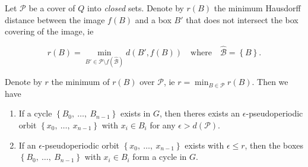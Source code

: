 \begin{proposition}
    \cite*{chain,dynbook}
    Let $\mathcal{P}$ be a cover of $Q$ into \emph{closed} sets. 
    Denote by $r(B)$ the minimum Hausdorff distance between the image $f(B)$ and a 
    box $B'$ that does not intersect the box covering of the image, ie 
    
    \begin{equation}
        r(B) = \min_{B' \in \mathcal{P} \setminus f(\hat{\mathcal{B}})} d(B', f(B)) 
        \quad \text{where} \quad \hat{\mathcal{B}} = \left\{ B \right\}.
    \end{equation}
    
    Denote by $r$ the minimum of $r(B)$ over $\mathcal{P}$, ie 
    $r = \min_{B \in \mathcal{P}} r(B)$. Then we have

    \begin{enumerate}
        \item If a cycle $\left\{ B_0,\ \ldots,\ B_{n-1} \right\}$ exists in $G$, then 
        theres exists an $\epsilon$-pseudoperiodic orbit 
        $\left\{ x_0,\ \ldots,\ x_{n-1} \right\}$ with $x_i \in B_i$ for any 
        $\epsilon > d(\mathcal{P})$. 
        \item If an $\epsilon$-pseudoperiodic orbit 
        $\left\{ x_0,\ \ldots,\ x_{n-1} \right\}$ exists with $\epsilon \leq r$, then the 
        boxes $\left\{ B_0,\ \ldots,\ B_{n-1} \right\}$ with $x_i \in B_i$ form a cycle in 
        $G$. 
    \end{enumerate}

\end{proposition}

